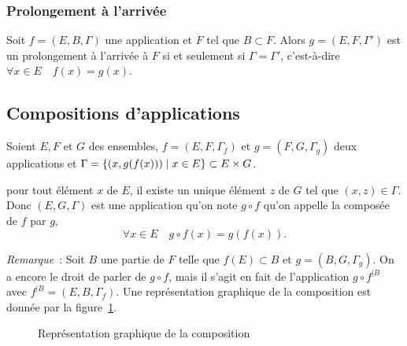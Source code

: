 \subsubsection{Prolongement à l'arrivée}
\label{chap3-subsubsec:prolongementarr}

Soit \(f = (E, B, \Gamma)\) une application et \(F\) tel que \(B \subset F\). Alors 
\(g = (E, F, \Gamma')\) est un prolongement à l'arrivée à \(F\) si et seulement si 
\(\Gamma = \Gamma'\), c'est-à-dire \(\forall x \in E \quad f(x) = g(x)\).

\subsection{Compositions d'applications}
\label{chap3-subsec:compapp}

\begin{defdef}
  Soient \(E, F\) et \(G\) des ensembles, \(f = (E, F, \Gamma_f)\) et \(g = (F,G, 
  \Gamma_g)\) deux applications et \(\Gamma = \left\{(x, g(f(x)))\mathrel{}\middle|\mathrel{}x \in E\right\} \subset 
  E \times G\).
\end{defdef}

pour tout élément \(x\) de \(E\), il existe un unique élément \(z\) de \(G\) tel 
que \((x, z) \in \Gamma\). Donc \((E, G, \Gamma)\) est une application qu'on note 
\(g \circ f\) qu'on appelle la composée de \(f\) par \(g\),
\begin{equation}
  \forall x \in E \quad g \circ f(x) = g(f(x)).
\end{equation}

\emph{Remarque}~: Soit \(B\) une partie de \(F\) telle que \(f(E) \subset B\) et 
\(g = (B, G, \Gamma_g)\). On a encore le droit de parler de \(g \circ f\), mais il 
s'agit en fait de l'application \(g \circ f^{|B}\) avec \( f^{|B} = (E, B, 
\Gamma_f)\). Une représentation graphique de la composition est donnée par la 
figure~\ref{chap3-fig:compose}.

\begin{figure}
  \centering
  \caption{Représentation graphique de la composition}
  \label{chap3-fig:compose}
\end{figure}

